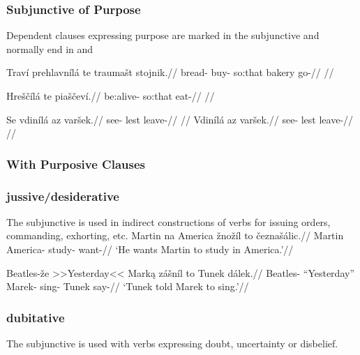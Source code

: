 \subsubsection{Subjunctive of Purpose}

Dependent clauses expressing purpose are marked in the subjunctive and normally end in  and 

\pex
\begingl
\gla Trav\'i prehlavn\'il\'a te trauma\v{s}t stojnik.//
\glb bread- buy- {so:that} bakery go-//
\glft {}//
\endgl
\xe

\pex
\begingl
\gla Hre\v{s}\v{c}\'il\'a te pia\v{s}\v{c}ev\'i.//
\glb be:alive- {so:that} eat-//
\glft {}//
\endgl
\xe

\pex
\a
\begingl
\gla Se vdin\'il\'a az var\v{s}ek.//
\glb {} see- {lest} leave-//
\glft {}//
\endgl
\a
\begingl
\gla Vdin\'il\'a az var\v{s}ek.//
\glb see- {lest} leave-//
\glft {}//
\endgl
\xe

\subsubsection{With Purposive Clauses}


\subsubsection{jussive/desiderative}
\par The subjunctive is used in indirect constructions of verbs for issuing orders, commanding, exhorting, etc.
\pex
\begingl
\gla Martin na America \v{z}no\v{z}\'il to \v{c}ezna\v{s}\'alic.//
\glb Martin  America- study-  want-//
\glft `He wants Martin to study in America.'//
\endgl
\xe

\pex
\begingl
\gla Beatles-\v{z}e >>Yesterday<< Mark\k{a} z\'a\v{s}n\'il to Tunek dálek.//
\glb Beatles- ``Yesterday'' Marek- sing-  Tunek say-//
\glft `Tunek told Marek to sing.'//
\endgl
\xe

\subsubsection{dubitative}
\par The subjunctive is used with verbs expressing doubt, uncertainty or disbelief.

